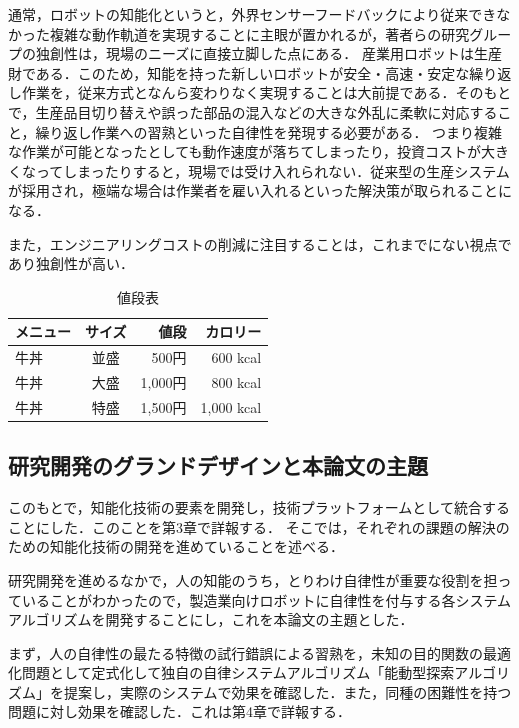 通常，ロボットの知能化というと，外界センサーフードバックにより従来できなかった複雑な動作軌道を実現することに主眼が置かれるが，著者らの研究グループの独創性は，現場のニーズに直接立脚した点にある．
産業用ロボットは生産財である．このため，知能を持った新しいロボットが安全・高速・安定な繰り返し作業を，従来方式となんら変わりなく実現することは大前提である．そのもとで，生産品目切り替えや誤った部品の混入などの大きな外乱に柔軟に対応すること，繰り返し作業への習熟といった自律性を発現する必要がある．
つまり複雑な作業が可能となったとしても動作速度が落ちてしまったり，投資コストが大きくなってしまったりすると，現場では受け入れられない．従来型の生産システムが採用され，極端な場合は作業者を雇い入れるといった解決策が取られることになる．

また，エンジニアリングコストの削減に注目することは，これまでにない視点であり独創性が高い．\cite{robotneeds}%


\begin{table}[tb]
  \centering
    \caption{値段表}
  \begin{tabular}{|l|c|r||r|} \hline
    メニュー & サイズ & 値段 & カロリー \\ \hline \hline
    牛丼 & 並盛 & 500円 & 600 kcal \\
    牛丼 & 大盛 & 1,000円 & 800 kcal \\
    牛丼 & 特盛 & 1,500円 & 1,000 kcal \\ \hline
  \end{tabular}
\end{table}


\subsection{研究開発のグランドデザインと本論文の主題}

このもとで，知能化技術の要素を開発し，技術プラットフォームとして統合することにした．このことを第3章で詳報する．
そこでは，それぞれの課題の解決のための知能化技術の開発を進めていることを述べる．

研究開発を進めるなかで，人の知能のうち，とりわけ自律性が重要な役割を担っていることがわかったので，製造業向けロボットに自律性を付与する各システムアルゴリズムを開発することにし，これを本論文の主題とした．

まず，人の自律性の最たる特徴の試行錯誤による習熟を，未知の目的関数の最適化問題として定式化して独自の自律システムアルゴリズム「能動型探索アルゴリズム」を提案し，実際のシステムで効果を確認した．また，同種の困難性を持つ問題に対し効果を確認した．これは第4章で詳報する．


